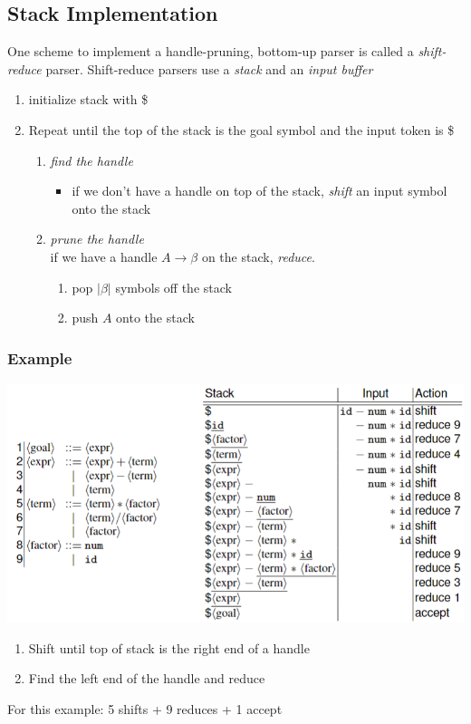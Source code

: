 \documentclass[10pt]{article}
\begin{document}
\subsection*{Stack Implementation}
One scheme to implement a handle-pruning, bottom-up parser is called a \textit{shift-reduce} parser.  Shift-reduce parsers use a \textit{stack} and an \textit{input buffer}
\begin{enumerate}
    \item initialize stack with \$
    \item Repeat until the top of the stack is the goal symbol and the input token is \$
    \begin{enumerate}
        \item \textit{find the handle}  
        \begin{itemize}
            \item if we don't have a handle on top of the stack, \textit{shift} an input symbol onto the stack
        \end{itemize}   
        \item \textit{prune the handle}\\
            if we have a handle $A \rightarrow \beta$ on the stack, \textit{reduce}.
            \begin{enumerate}
                \item pop $\vert \beta \vert$ symbols off the stack
                \item push $A$ onto the stack
            \end{enumerate}
    \end{enumerate}
\end{enumerate}

\subsubsection*{Example}
\begin{center}
    \includegraphics*[scale=1]{W7_3.png}
\end{center}
\begin{enumerate}
    \item Shift until top of stack is the right end of a handle
    \item Find the left end of the handle and reduce
\end{enumerate}
For this example: 5 shifts + 9 reduces + 1 accept
\end{document}
